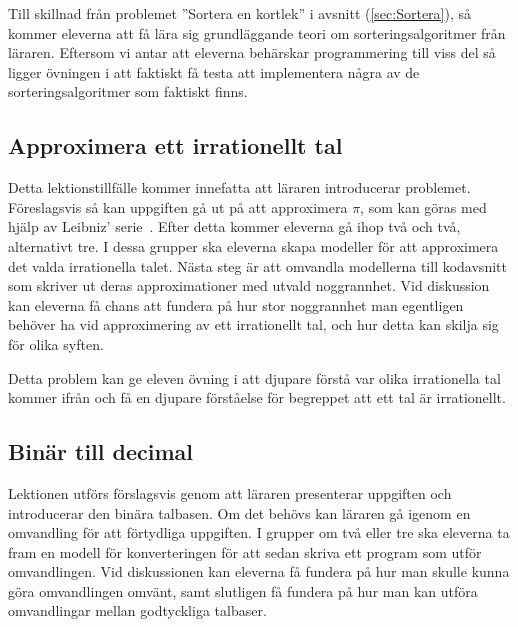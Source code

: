     \textcolor{WildStrawberry}{
        Till skillnad från problemet ''Sortera en kortlek'' i avsnitt (\ref{sec:Sortera}), så kommer eleverna att få lära sig grundläggande teori om sorteringsalgoritmer från läraren. Eftersom vi antar att eleverna behärskar programmering till viss del så ligger övningen i att faktiskt få testa att implementera några av de sorteringsalgoritmer som faktiskt finns.}
        
\subsection{Approximera ett irrationellt tal}
    \label{sec:approx}
    
    \textcolor{WildStrawberry}{
        Detta lektionstillfälle kommer innefatta att läraren introducerar problemet. Föreslagsvis så kan uppgiften gå ut på att approximera $\pi$, som kan göras med hjälp av Leibniz' serie~\cite{pi}. Efter detta kommer eleverna gå ihop två och två, alternativt tre. I dessa grupper ska eleverna skapa modeller för att approximera det valda irrationella talet. Nästa steg är att omvandla modellerna till kodavsnitt som skriver ut deras approximationer med utvald noggrannhet. 
        Vid diskussion kan eleverna få chans att fundera på hur stor noggrannhet man egentligen behöver ha vid approximering av ett irrationellt tal, och hur detta kan skilja sig för olika syften.
        }
        
    \textcolor{WildStrawberry}{
        Detta problem kan ge eleven övning i att djupare förstå var olika irrationella tal kommer ifrån och få en djupare förståelse för begreppet att ett tal är irrationellt.}

\subsection{Binär till decimal}
    \label{sec:binar}
    
    \textcolor{WildStrawberry}{Lektionen utförs förslagsvis genom att läraren presenterar uppgiften och introducerar den binära talbasen. Om det behövs kan läraren gå igenom en omvandling för att förtydliga uppgiften. I grupper om två eller tre ska eleverna ta fram en modell för konverteringen för att sedan skriva ett program som utför omvandlingen. Vid diskussionen kan eleverna få fundera på hur man skulle kunna göra omvandlingen omvänt, samt slutligen få fundera på hur man kan utföra omvandlingar mellan godtyckliga talbaser.}
    
